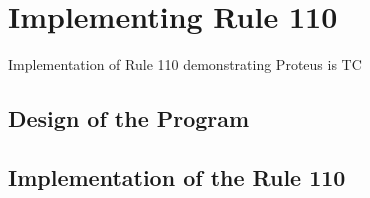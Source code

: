 \section{Implementing Rule 110}\label{sec:ImplementRule110}

Implementation of Rule 110 demonstrating Proteus is TC

\subsection{Design of the Program}

\subsection{Implementation of the Rule 110}
